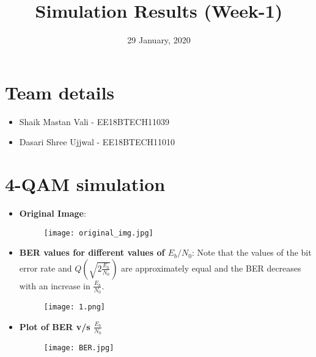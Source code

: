 \documentclass{article}
\title{Simulation Results (Week-1)}
\date{29 January, 2020}
\begin{document}
\maketitle

\section{Team details}
{\begin{itemize}
    \item Shaik Mastan Vali - EE18BTECH11039
    \item Dasari Shree Ujjwal - EE18BTECH11010
\end{itemize}}

\section{4-QAM simulation}
{\begin{itemize}
    \item \textbf{Original Image}:
    \begin{figure}[h]
    \centering
    \texttt{[image: original\_img.jpg]}
    \end{figure}
    
    \item \textbf{BER values for different values of \(E_b/N_0\)}: \newline
    Note that the values of the bit error rate and \(Q(\sqrt{2\frac{E_b}{N_0}})\) are approximately equal and the BER decreases with an increase in \(\frac{E_b}{N_0}\).
    \begin{figure}[!htb]
    \centering
    \texttt{[image: 1.png]}
    \end{figure}
    
    \item \textbf{Plot of BER v/s \(\frac{E_b}{N_0}\)}
    \begin{figure}[!htb]
    \centering
    \texttt{[image: BER.jpg]}
    \end{figure}
\end{itemize}
}
 
\end{document}
